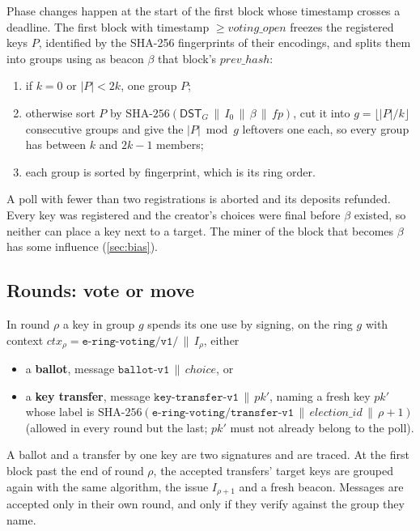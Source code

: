 \documentclass[11pt,a4paper]{article}
\newcommand{\pk}{\mathit{pk}}
\newcommand{\ctx}{\mathit{ctx}}
\newcommand{\dst}{\mathsf{DST}}
\theoremstyle{definition}
\begin{document}
Phase changes happen at the start of the first block whose timestamp
crosses a deadline. The first block with timestamp $\ge
\mathit{voting\_open}$ freezes the registered keys $P$, identified by the
SHA-256 fingerprints of their encodings, and splits them into groups using
as beacon $\beta$ that block's $\mathit{prev\_hash}$:
\begin{enumerate}[leftmargin=*]
\item if $k = 0$ or $|P| < 2k$, one group $P$;
\item otherwise sort $P$ by $\mathrm{SHA\text{-}256}(\dst_G \,\|\, I_0
      \,\|\, \beta \,\|\, \mathit{fp})$, cut it into $g = \lfloor |P|/k
      \rfloor$ consecutive groups and give the $|P| \bmod g$ leftovers
      one each, so every group has between $k$ and $2k-1$ members;
\item each group is sorted by fingerprint, which is its ring order.
\end{enumerate}
A poll with fewer than two registrations is aborted and its deposits
refunded. Every key was registered and the creator's choices were final
before $\beta$ existed, so neither can place a key next to a target. The
miner of the block that becomes $\beta$ has some influence
(\cref{sec:bias}).

\subsection{Rounds: vote or move}
\label{sec:transfers}

In round $\rho$ a key in group $g$ spends its one use by signing, on the
ring $g$ with context $\ctx_\rho = \texttt{e-ring-voting/v1/}\,\|\,I_\rho$,
either
\begin{itemize}[leftmargin=*]
\item a \textbf{ballot}, message $\texttt{ballot-v1} \,\|\, \mathit{choice}$, or
\item a \textbf{key transfer}, message $\texttt{key-transfer-v1} \,\|\,
      \pk'$, naming a fresh key $\pk'$ whose label is
      $\mathrm{SHA\text{-}256}(\texttt{e-ring-voting/transfer-v1} \,\|\,
      \mathit{election\_id} \,\|\, \rho + 1)$ (allowed in every round but
      the last; $\pk'$ must not already belong to the poll).
\end{itemize}
A ballot and a transfer by one key are two signatures and are traced. At
the first block past the end of round $\rho$, the accepted transfers'
target keys are grouped again with the same algorithm, the issue
$I_{\rho+1}$ and a fresh beacon. Messages are accepted only in their own
round, and only if they verify against the group they name.
\end{document}
